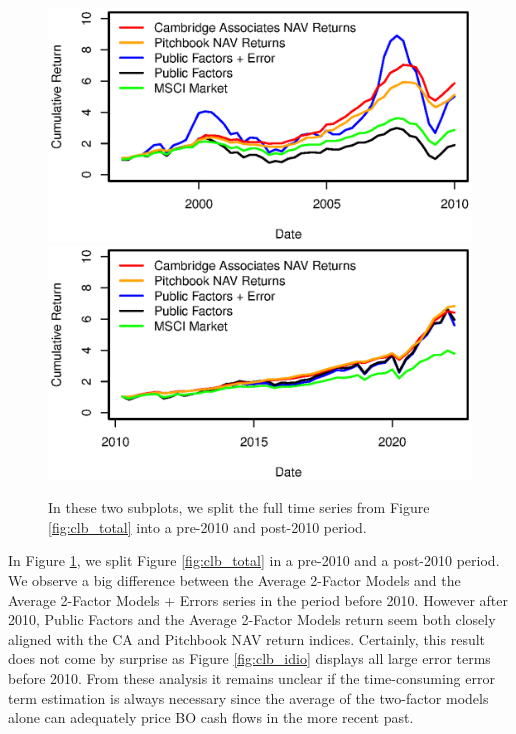 \documentclass[12pt]{article}
\begin{document}
\begin{figure}[H]
	\centering
	\includegraphics{Figures/TotalErrorSeriesBOpre2010}
	\includegraphics{Figures/TotalErrorSeriesBOpost2010}
	\caption{
		In these two subplots, we split the full time series from Figure \ref{fig:clb_total} into a pre-2010 and post-2010 period.
	}
	\label{fig:clb_pre_post_2010}
\end{figure}




In Figure \ref{fig:clb_pre_post_2010}, we split Figure \ref{fig:clb_total} in a pre-2010 and a post-2010 period.
We observe a big difference between the Average 2-Factor Models and the Average 2-Factor Models + Errors series in the period before 2010.
However after 2010, Public Factors and the Average 2-Factor Models return seem both closely aligned with the CA and Pitchbook NAV return indices.
Certainly, this result does not come by surprise as Figure \ref{fig:clb_idio} displays all large error terms before 2010.
From these analysis it remains unclear if the time-consuming error term estimation is always necessary since the average of the two-factor models alone can adequately price BO cash flows in the more recent past.
\end{document}
